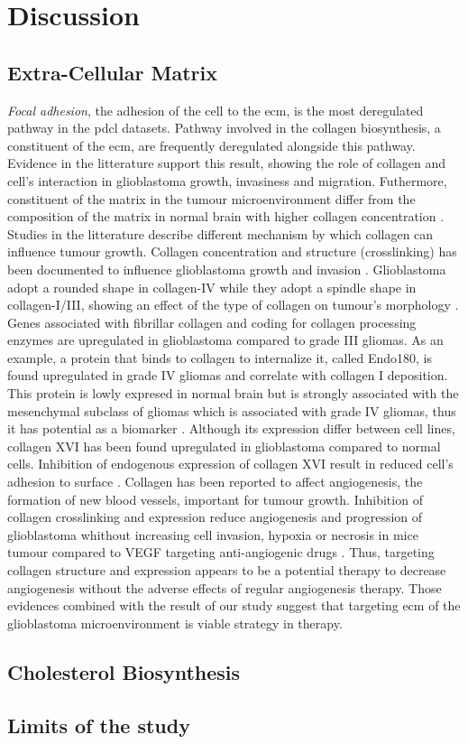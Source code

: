 \section{Discussion}

\subsection{Extra-Cellular Matrix}

\textit{Focal adhesion}, the adhesion of the cell to the \acrshort{ecm}, is the most deregulated pathway in the \acrshort{pdcl} datasets.
Pathway involved in the collagen biosynthesis, a constituent of the \acrshort{ecm}, are frequently deregulated alongside this pathway.
Evidence in the litterature support this result, showing the role of collagen and cell's interaction in glioblastoma growth, invasiness and migration.
Futhermore, constituent of the matrix in the tumour microenvironment differ from the composition of the matrix in normal brain with higher collagen concentration \cite*{Mammoto2013}.
Studies in the litterature describe different mechanism by which collagen can influence tumour growth.
Collagen concentration and structure (crosslinking) has been documented to influence glioblastoma growth and invasion \cite*{Kaphle2019,Kaufman2005,Rao2013}. 
Glioblastoma adopt a rounded shape in collagen-IV while they adopt a spindle shape in collagen-I/III, showing an effect of the type of collagen on tumour's morphology \cite*{Rao2013}.
Genes associated with fibrillar collagen and coding for collagen processing enzymes are upregulated in glioblastoma compared to grade III gliomas.
As an example, a protein that binds to collagen to internalize it, called Endo180, is found upregulated in grade IV gliomas and correlate with collagen I deposition. 
This protein is lowly expresed in normal brain but is strongly associated with the mesenchymal subclass of gliomas which is associated with grade IV gliomas, thus it has potential as a biomarker \cite*{Huijbers2010}.
Although its expression differ between cell lines, collagen XVI has been found upregulated in glioblastoma compared to normal cells.
Inhibition of endogenous expression of collagen XVI result in reduced cell's adhesion to surface \cite*{Senner2008}.
Collagen has been reported to affect angiogenesis, the formation of new blood vessels, important for tumour growth.
Inhibition of collagen crosslinking and expression reduce angiogenesis and progression of glioblastoma whithout increasing cell invasion, hypoxia or necrosis in mice tumour compared to VEGF targeting anti-angiogenic drugs \cite*{Mammoto2013}.
Thus, targeting collagen structure and expression appears to be a potential therapy to decrease angiogenesis without the adverse effects of regular angiogenesis therapy.
Those evidences combined with the result of our study suggest that targeting \acrshort{ecm} of the glioblastoma microenvironment is viable strategy in therapy.

\subsection{Cholesterol Biosynthesis}

\subsection{Limits of the study}

